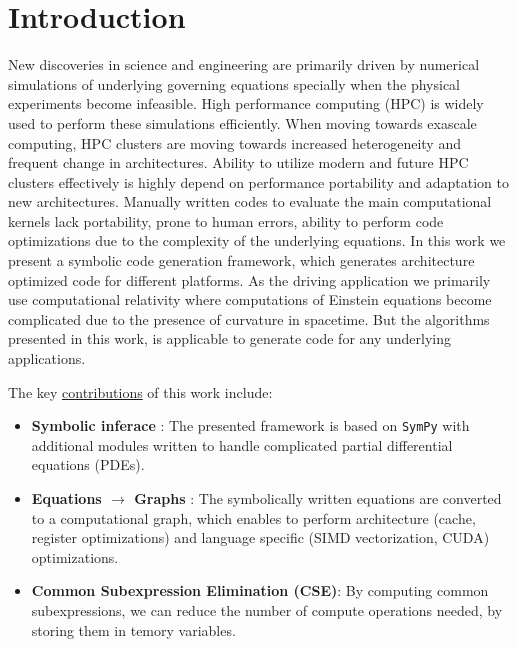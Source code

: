 \documentclass[sigconf,]{acmart}
\begin{document}
\section{Introduction}
New discoveries in science and engineering are primarily driven by numerical simulations of underlying governing equations specially when the physical experiments become infeasible. High performance computing (HPC) is widely used to perform these simulations efficiently. When moving towards exascale computing, HPC clusters are moving towards increased heterogeneity and frequent change in architectures. Ability to utilize modern and future HPC clusters effectively is highly depend on performance portability and adaptation to new architectures. Manually written codes to evaluate the main computational kernels lack portability, prone to human errors, ability to perform code optimizations due to the complexity of the underlying equations. In this work we present a symbolic code generation framework, which generates architecture optimized code for different platforms. As the driving application we primarily use computational relativity where computations of Einstein equations become complicated due to the presence of curvature in spacetime. But the algorithms presented in this work, is applicable to generate code for any underlying applications.

\noindent The key \ul{contributions} of this work include:
\begin{itemize}
	\item \textbf{Symbolic inferace} : The presented framework is based on \texttt{SymPy} with additional modules written to handle complicated partial differential equations (PDEs). 
	\item \textbf{Equations $\rightarrow$ Graphs} : The symbolically written equations are converted to a computational graph, which enables to perform architecture (cache, register optimizations) and language specific (SIMD vectorization, CUDA) optimizations.
	\item \textbf{Common Subexpression Elimination (CSE)}: By computing common subexpressions, we can reduce the number of compute operations needed, by storing them in temory variables. 
\end{itemize}
\end{document}
